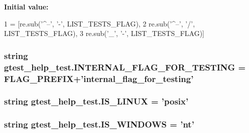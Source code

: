 {\bfseries Initial value\-:}
\begin{DoxyCode}
1 = [re.sub(\textcolor{stringliteral}{'^--'}, \textcolor{stringliteral}{'-'}, LIST\_TESTS\_FLAG),
2                            re.sub(\textcolor{stringliteral}{'^--'}, \textcolor{stringliteral}{'/'}, LIST\_TESTS\_FLAG),
3                            re.sub(\textcolor{stringliteral}{'\_'}, \textcolor{stringliteral}{'-'}, LIST\_TESTS\_FLAG)]
\end{DoxyCode}
\hypertarget{namespacegtest__help__test_aa7f487cde98f691eecc5f1f5e67c0a69}{
\subsubsection[{I\-N\-T\-E\-R\-N\-A\-L\-\_\-\-F\-L\-A\-G\-\_\-\-F\-O\-R\-\_\-\-T\-E\-S\-T\-I\-N\-G}]{\setlength{\rightskip}{0pt plus 5cm}string gtest\-\_\-help\-\_\-test.\-I\-N\-T\-E\-R\-N\-A\-L\-\_\-\-F\-L\-A\-G\-\_\-\-F\-O\-R\-\_\-\-T\-E\-S\-T\-I\-N\-G = {\bf F\-L\-A\-G\-\_\-\-P\-R\-E\-F\-I\-X}+'internal\-\_\-flag\-\_\-for\-\_\-testing'}}\label{namespacegtest__help__test_aa7f487cde98f691eecc5f1f5e67c0a69}
\hypertarget{namespacegtest__help__test_ae61a149d50be253176a139fbe6712582}{
\subsubsection[{I\-S\-\_\-\-L\-I\-N\-U\-X}]{\setlength{\rightskip}{0pt plus 5cm}string gtest\-\_\-help\-\_\-test.\-I\-S\-\_\-\-L\-I\-N\-U\-X = 'posix'}}\label{namespacegtest__help__test_ae61a149d50be253176a139fbe6712582}
\hypertarget{namespacegtest__help__test_a0f8d4b00fc83b1e72bbb5eca5f3bc4d7}{
\subsubsection[{I\-S\-\_\-\-W\-I\-N\-D\-O\-W\-S}]{\setlength{\rightskip}{0pt plus 5cm}string gtest\-\_\-help\-\_\-test.\-I\-S\-\_\-\-W\-I\-N\-D\-O\-W\-S = 'nt'}}\label{namespacegtest__help__test_a0f8d4b00fc83b1e72bbb5eca5f3bc4d7}

